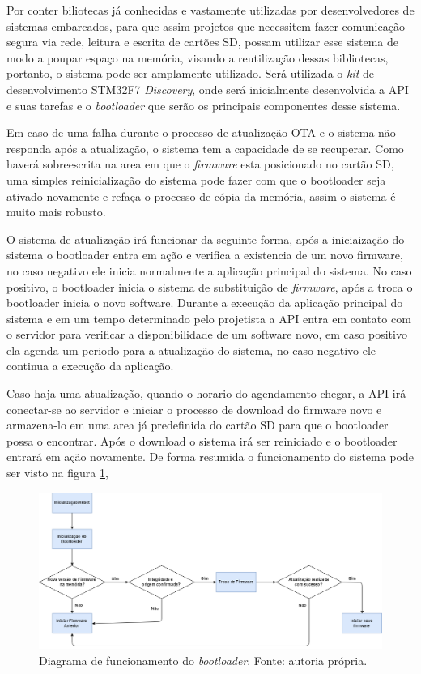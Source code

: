 Por conter biliotecas já conhecidas e vastamente utilizadas por desenvolvedores de sistemas embarcados, para que assim projetos que necessitem fazer comunicação segura via rede, leitura e escrita de cartões SD, possam utilizar esse sistema de modo a poupar espaço na memória, visando a reutilização dessas bibliotecas, portanto, o sistema pode ser amplamente utilizado. Será utilizada o \textit{kit} de desenvolvimento STM32F7 \textit{Discovery}, onde será inicialmente desenvolvida a API e suas tarefas e o \textit{bootloader} que serão os principais componentes desse sistema.

Em caso de uma falha durante o processo de atualização OTA e o sistema não responda após a atualização, o sistema tem a capacidade de se recuperar. Como haverá sobreescrita na area em que o \textit{firmware} esta posicionado no cartão SD, uma simples reinicialização do sistema pode fazer com que o bootloader seja ativado novamente e refaça o processo de cópia da memória, assim o sistema é muito mais robusto.

O sistema de atualização irá funcionar da seguinte forma, após a iniciaização do sistema o bootloader entra em ação e verifica a existencia de um novo firmware, no caso negativo ele inicia normalmente a aplicação principal do sistema. No caso positivo, o bootloader inicia o sistema de substituição de \textit{firmware}, após a troca o bootloader inicia o novo software. Durante a execução da aplicação principal do sistema e em um tempo determinado pelo projetista a API entra em contato com o servidor para verificar a disponibilidade de um software novo, em caso positivo ela agenda um periodo para a atualização do sistema, no caso negativo ele continua a execução da aplicação. 

Caso haja uma atualização, quando o horario do agendamento chegar, a API irá conectar-se ao servidor e iniciar o processo de download do firmware novo e armazena-lo em uma area já predefinida do cartão SD para que o bootloader possa o encontrar. Após o download o sistema irá ser reiniciado e o bootloader entrará em ação novamente. 
De forma resumida o funcionamento do sistema pode ser visto na figura \ref{Funcionamento}, 

\begin{figure}[H]
    \scriptsize
     \centering
     \includegraphics[scale=0.39]{dados/figuras/DiagramaBootloader.png}
     \caption{Diagrama de funcionamento do \textit{bootloader}. Fonte: autoria própria.}
     \label{Funcionamento}
\end{figure}

